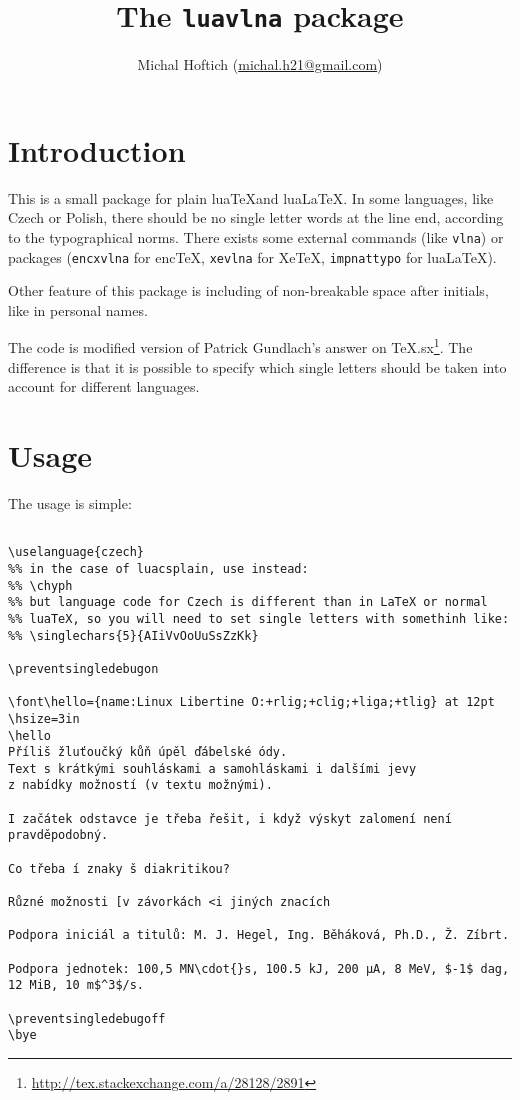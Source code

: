 \documentclass[12pt]{ltxdoc}
\begin{document}
\title{The \verb|luavlna| package}
\author{Michal Hoftich (\url{michal.h21@gmail.com})}
\maketitle
\tableofcontents
\section{Introduction}


This is a small package for plain lua\TeX and lua\LaTeX. In some languages, like
Czech or Polish, there should be no single letter words at the line
end, according to the typographical norms. There exists some
external commands (like \verb!vlna!) or packages (\verb!encxvlna!
for enc\TeX, \verb!xevlna! for Xe\TeX,
\verb!impnattypo! for lua\LaTeX). %

Other feature of this package is including of non-breakable space after 
initials, like in personal names. 

The code is modified version of Patrick Gundlach's answer on
TeX.sx\footnote{\url{http://tex.stackexchange.com/a/28128/2891}}.
The difference is that it is possible to specify which single letters
should be taken into account for different languages.


\section{Usage}

The usage is simple:

\begin{verbatim}

\uselanguage{czech}
%% in the case of luacsplain, use instead:
%% \chyph
%% but language code for Czech is different than in LaTeX or normal 
%% luaTeX, so you will need to set single letters with somethinh like:
%% \singlechars{5}{AIiVvOoUuSsZzKk}

\preventsingledebugon

\font\hello={name:Linux Libertine O:+rlig;+clig;+liga;+tlig} at 12pt 
\hsize=3in
\hello
Příliš žluťoučký kůň úpěl ďábelské ódy. 
Text s krátkými souhláskami a samohláskami i dalšími jevy 
z nabídky možností (v textu možnými). 

I začátek odstavce je třeba řešit, i když výskyt zalomení není pravděpodobný.

Co třeba í znaky š diakritikou?

Různé možnosti [v závorkách <i jiných znacích

Podpora iniciál a titulů: M. J. Hegel, Ing. Běháková, Ph.D., Ž. Zíbrt.

Podpora jednotek: 100,5 MN\cdot{}s, 100.5 kJ, 200 µA, 8 MeV, $-1$ dag, 12 MiB, 10 m$^3$/s.

\preventsingledebugoff
\bye
\end{verbatim}
\end{document}
